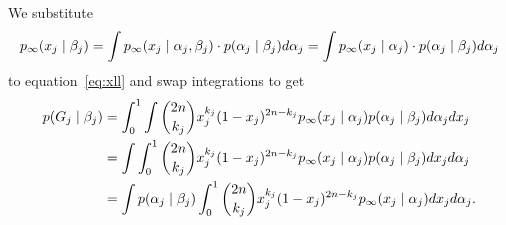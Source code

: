 \documentclass[10pt]{article}
\begin{document}
We substitute 
\begin{align}
    p_{\infty}(x_j \mid \beta_j) 
        =
        \int p_{\infty}(x_j \mid \alpha_j, \beta_j) \cdot p(\alpha_j \mid \beta_j) d\alpha_j 
        = \int p_{\infty}(x_j \mid \alpha_j) \cdot p(\alpha_j \mid \beta_j) d\alpha_j 
\end{align}
to equation~\ref{eq:xll} and swap integrations to get
\begin{align} \label{eq:swapped}
    \begin{aligned}
    p(G_j \mid \beta_j) &=
    \int_0^1 \int 
    \binom{2n}{k_j} x_j^{k_j}(1-x_j)^{2n-k_j}
    p_{\infty}(x_j \mid \alpha_j) p(\alpha_j \mid \beta_j) d\alpha_j dx_j \\
    &= \int \int_0^1
    \binom{2n}{k_j} x_j^{k_j}(1-x_j)^{2n-k_j}
    p_{\infty}(x_j \mid \alpha_j) p(\alpha_j \mid \beta_j) dx_j d\alpha_j  \\
    &= \int p(\alpha_j \mid \beta_j)\int_0^1
    \binom{2n}{k_j} x_j^{k_j}(1-x_j)^{2n-k_j}
    p_{\infty}(x_j \mid \alpha_j)  dx_j d\alpha_j. 
    \end{aligned}
\end{align}
\end{document}
